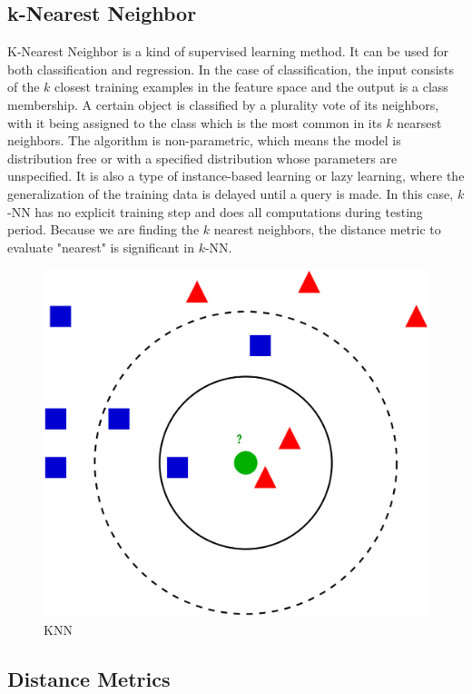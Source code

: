 \documentclass[conference]{IEEEtran}
\begin{document}
\subsection{k-Nearest Neighbor}
K-Nearest Neighbor is a kind of supervised learning method. It can be used for both classification and regression.
In the case of classification, the input consists of the $k$ closest training examples in the feature space and the output is a class membership.
A certain object is classified by a plurality vote of its neighbors, with it being assigned to the class which is the most common in its $k$ nearsest neighbors.
The algorithm is non-parametric\cite{knn}, which means the model is distribution free or with a specified distribution whose parameters are unspecified.
It is also a type of instance-based learning or lazy learning, where the generalization of the training data is delayed until a query is made. In this case, $k$-NN has no explicit 
training step and does all computations during testing period. Because we are finding the $k$ nearest neighbors, the distance metric to evaluate "nearest" is significant in $k$-NN.
\begin{figure}[htbp]
	\centering
	\includegraphics[scale=0.1]{pic/KNN.png}
	\caption{KNN}
	\label{fig:knn}
\end{figure}
\subsection{Distance Metrics}
\end{document}
